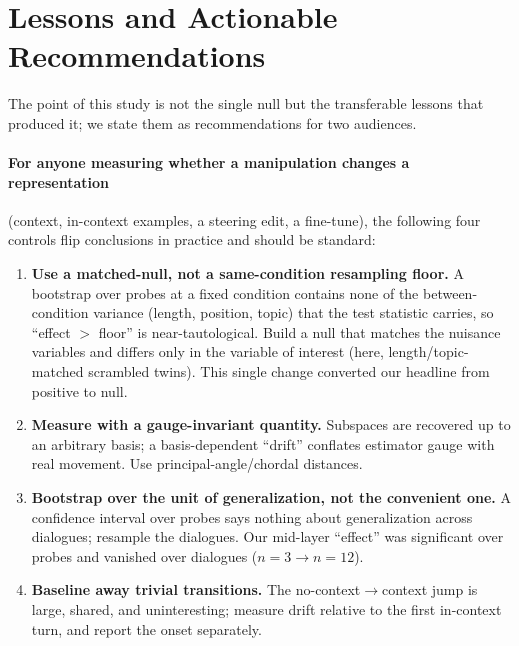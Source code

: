 \documentclass{article}
\begin{document}
\section{Lessons and Actionable Recommendations}
\label{sec:lessons}

The point of this study is not the single null but the transferable lessons that produced
it; we state them as recommendations for two audiences.

\paragraph{For anyone measuring whether a manipulation changes a representation}
(context, in-context examples, a steering edit, a fine-tune), the following four controls
flip conclusions in practice and should be standard:
\begin{enumerate}
\item \textbf{Use a matched-null, not a same-condition resampling floor.} A bootstrap over
probes at a fixed condition contains none of the between-condition variance (length, position,
topic) that the test statistic carries, so ``effect $>$ floor'' is near-tautological. Build a
null that matches the nuisance variables and differs only in the variable of interest (here,
length/topic-matched scrambled twins). This single change converted our headline from
positive to null.
\item \textbf{Measure with a gauge-invariant quantity.} Subspaces are recovered up to an
arbitrary basis; a basis-dependent ``drift'' conflates estimator gauge with real movement.
Use principal-angle/chordal distances.
\item \textbf{Bootstrap over the unit of generalization, not the convenient one.} A
confidence interval over probes says nothing about generalization across dialogues; resample
the dialogues. Our mid-layer ``effect'' was significant over probes and vanished over
dialogues ($n{=}3 \to n{=}12$).
\item \textbf{Baseline away trivial transitions.} The no-context$\to$context jump is large,
shared, and uninteresting; measure drift relative to the first in-context turn, and report the
onset separately.
\end{enumerate}
\end{document}
